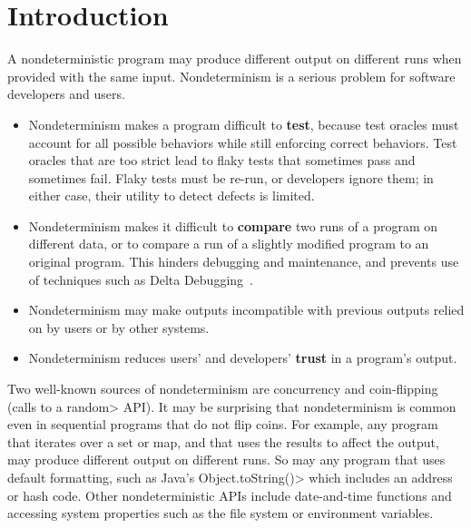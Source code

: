 \section{Introduction}

A nondeterministic program may produce different output on different runs
when provided with the same input.
Nondeterminism is a serious problem for software developers and users.
\begin{itemize}
\item
  Nondeterminism makes a program difficult to \textbf{test}, because test
  oracles must account for all possible behaviors while still enforcing
  correct behaviors.  Test oracles that are too strict lead to flaky tests
  that sometimes pass and sometimes fail.  Flaky tests must be re-run, or
  developers ignore them; in either case, their utility to detect defects
  is limited.
\item
  Nondeterminism makes it difficult to \textbf{compare} two runs of a
  program on different data, or to compare a run of a slightly modified
  program to an original program.  This hinders debugging and maintenance,
  and prevents use of techniques such as Delta Debugging~\cite{Zeller1999}.
\item
  Nondeterminism may make outputs incompatible with previous outputs relied
  on by users or by other systems.
\item
  Nondeterminism reduces users' and developers' \textbf{trust} in a program's output.
\end{itemize}

Two well-known sources of nondeterminism are concurrency
and coin-flipping
(calls to a \<random> API\@).
It may be surprising that nondeterminism is common even in sequential
programs that do not flip coins.
For example, any program that iterates over a set or map, and that uses the
results to affect the output, may produce different output on different runs.
So may any program that uses default formatting, such as Java's
\<Object.toString()> which includes an address or hash code.
Other nondeterministic APIs include date-and-time functions and
accessing system properties such as the file system or environment variables.

